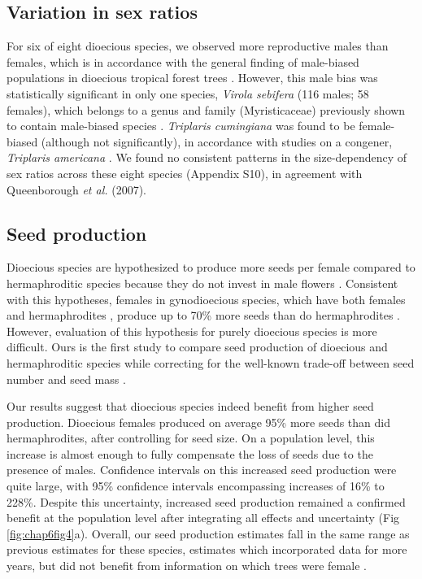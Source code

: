 \documentclass[b5paper,justified]{tufte-book} %
\begin{document}
\begin{fullwidth}
\subsection{Variation in sex ratios}
For six of eight dioecious species, we observed more reproductive males than females, which is in accordance with the general finding of male-biased populations in dioecious tropical forest trees \citep{Opler1978, Queenborough2007}. However, this male bias was statistically significant in only one species, \textit{Virola sebifera }(116 males; 58 females), which belongs to a genus and family (Myristicaceae) previously shown to contain male-biased species \citep{Queenborough2007}. \textit{Triplaris cumingiana} was found to be female-biased (although not significantly), in accordance with studies on a congener, \textit{Triplaris americana} \citep{Bawa1977, Melampy1977}. We found no consistent patterns in the size-dependency of sex ratios across these eight species (Appendix S10), in agreement with Queenborough \textit{et al.} (2007).

\subsection{Seed production}
Dioecious species are hypothesized to produce more seeds per female compared to hermaphroditic species because they do not invest in male flowers \citep{Heilbuth2001, Barot2004, Vamosi2008}. Consistent with this hypotheses, females in gynodioecious species, which have both females and hermaphrodites \citep{Bawa1981}, produce up to 70\% more seeds than do hermaphrodites \citep{Ashman1994, Ashman1999, Asikainen2003, Spigler2011}.  However, evaluation of this hypothesis for purely dioecious species is more difficult. Ours is the first study to compare seed production of dioecious and hermaphroditic species while correcting for the well-known trade-off between seed number and seed mass \citep{Moles2004, Muller-Landau2008}. 

Our results suggest that dioecious species indeed benefit from higher seed production. Dioecious females produced on average 95\% more seeds than did hermaphrodites, after controlling for seed size. On a population level, this increase is almost enough to fully compensate the loss of seeds due to the presence of males. Confidence intervals on this increased seed production were quite large, with 95\% confidence intervals encompassing increases of 16\% to 228\%. Despite this uncertainty, increased seed production remained a confirmed benefit at the population level after integrating all effects and uncertainty (Fig \ref{fig:chap6fig4}a). Overall, our seed production estimates fall in the same range as previous estimates for these species, estimates which incorporated data for more years, but did not benefit from information on which trees were female \citep{Muller-Landau2008}.


\end{fullwidth}
\end{document}
